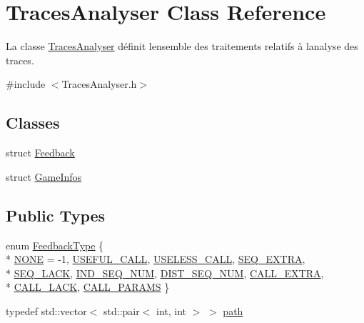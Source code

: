 \hypertarget{class_traces_analyser}{}\section{Traces\+Analyser Class Reference}
\label{class_traces_analyser}


La classe \hyperlink{class_traces_analyser}{Traces\+Analyser} définit l\textquotesingle{}ensemble des traitements relatifs à l\textquotesingle{}analyse des traces.  




{\ttfamily \#include $<$Traces\+Analyser.\+h$>$}

\subsection*{Classes}
\begin{DoxyCompactItemize}
\item 
struct \hyperlink{struct_traces_analyser_1_1_feedback}{Feedback}
\item 
struct \hyperlink{struct_traces_analyser_1_1_game_infos}{Game\+Infos}
\end{DoxyCompactItemize}
\subsection*{Public Types}
\begin{DoxyCompactItemize}
\item 
enum \hyperlink{class_traces_analyser_a57be29ce5ac10ca51e56d8385b4a1820}{Feedback\+Type} \{ \\*
\hyperlink{class_traces_analyser_a57be29ce5ac10ca51e56d8385b4a1820a30a02bf0d89826bac04b59a3723f6225}{N\+O\+NE} = -\/1, 
\hyperlink{class_traces_analyser_a57be29ce5ac10ca51e56d8385b4a1820a08d214704090ad0ead7d60fc2775f2c3}{U\+S\+E\+F\+U\+L\+\_\+\+C\+A\+LL}, 
\hyperlink{class_traces_analyser_a57be29ce5ac10ca51e56d8385b4a1820a08b0a1ea5237d7bab9b09490e7e30b42}{U\+S\+E\+L\+E\+S\+S\+\_\+\+C\+A\+LL}, 
\hyperlink{class_traces_analyser_a57be29ce5ac10ca51e56d8385b4a1820a1b8c8e95fab1f4dde6d38848785a7e08}{S\+E\+Q\+\_\+\+E\+X\+T\+RA}, 
\\*
\hyperlink{class_traces_analyser_a57be29ce5ac10ca51e56d8385b4a1820acd30979f43c0fd19d60770022386222d}{S\+E\+Q\+\_\+\+L\+A\+CK}, 
\hyperlink{class_traces_analyser_a57be29ce5ac10ca51e56d8385b4a1820a6ed25d15ae1133d3fa4a095e38f274ad}{I\+N\+D\+\_\+\+S\+E\+Q\+\_\+\+N\+UM}, 
\hyperlink{class_traces_analyser_a57be29ce5ac10ca51e56d8385b4a1820aea74b14f216c72b2b6ef13ebe16b48f4}{D\+I\+S\+T\+\_\+\+S\+E\+Q\+\_\+\+N\+UM}, 
\hyperlink{class_traces_analyser_a57be29ce5ac10ca51e56d8385b4a1820a14b0fc808a62906ab67aa4b182fe823c}{C\+A\+L\+L\+\_\+\+E\+X\+T\+RA}, 
\\*
\hyperlink{class_traces_analyser_a57be29ce5ac10ca51e56d8385b4a1820a6bdc7824ca798742b8ff903b2c3de12f}{C\+A\+L\+L\+\_\+\+L\+A\+CK}, 
\hyperlink{class_traces_analyser_a57be29ce5ac10ca51e56d8385b4a1820a7ed621eaa247a6d92a9b78e3f3359bf5}{C\+A\+L\+L\+\_\+\+P\+A\+R\+A\+MS}
 \}
\item 
typedef std\+::vector$<$ std\+::pair$<$ int, int $>$ $>$ \hyperlink{class_traces_analyser_a07dca9f55e9ec0dad64e9bf14d329003}{path}
\end{DoxyCompactItemize}
